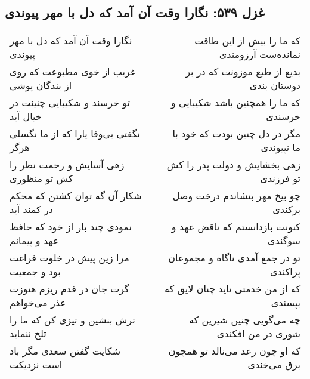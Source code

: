 \begin{center}
\section*{غزل ۵۳۹: نگارا وقت آن آمد که دل با مهر پیوندی}
\label{sec:539}
\begin{longtable}{l p{0.5cm} r}
نگارا وقت آن آمد که دل با مهر پیوندی
&&
که ما را بیش از این طاقت نمانده‌ست آرزومندی
\\
غریب از خوی مطبوعت که روی از بندگان پوشی
&&
بدیع از طبع موزونت که در بر دوستان بندی
\\
تو خرسند و شکیبایی چنینت در خیال آید
&&
که ما را همچنین باشد شکیبایی و خرسندی
\\
نگفتی بی‌وفا یارا که از ما نگسلی هرگز
&&
مگر در دل چنین بودت که خود با ما نپیوندی
\\
زهی آسایش و رحمت نظر را کش تو منظوری
&&
زهی بخشایش و دولت پدر را کش تو فرزندی
\\
شکار آن گه توان کشتن که محکم در کمند آید
&&
چو بیخ مهر بنشاندم درخت وصل برکندی
\\
نمودی چند بار از خود که حافظ عهد و پیمانم
&&
کنونت بازدانستم که ناقض عهد و سوگندی
\\
مرا زین پیش در خلوت فراغت بود و جمعیت
&&
تو در جمع آمدی ناگاه و مجموعان پراکندی
\\
گرت جان در قدم ریزم هنوزت عذر می‌خواهم
&&
که از من خدمتی ناید چنان لایق که بپسندی
\\
ترش بنشین و تیزی کن که ما را تلخ ننماید
&&
چه می‌گویی چنین شیرین که شوری در من افکندی
\\
شکایت گفتن سعدی مگر باد است نزدیکت
&&
که او چون رعد می‌نالد تو همچون برق می‌خندی
\\
\end{longtable}
\end{center}
